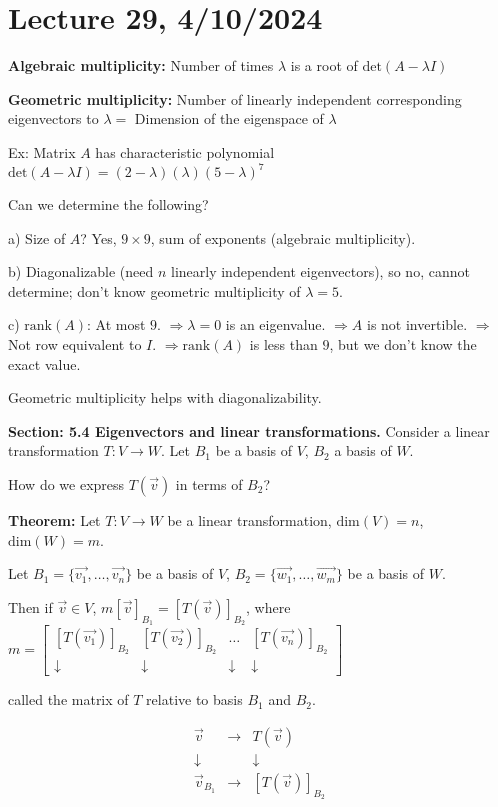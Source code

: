 \documentclass{article}
\begin{document}
\section{Lecture 29, 4/10/2024}

\textbf{Algebraic multiplicity:} Number of times $\lambda$ is a root of $\text{det}(A-\lambda I)$

\textbf{Geometric multiplicity:} Number of linearly independent corresponding eigenvectors to $\lambda =$ Dimension of the eigenspace of $\lambda$

Ex: Matrix $A$ has characteristic polynomial $\text{det}(A-\lambda I) = (2-\lambda)(\lambda)(5-\lambda)^7$

Can we determine the following?

a) Size of $A$? Yes, $9 \times 9$, sum of exponents (algebraic multiplicity).

b) Diagonalizable (need $n$ linearly independent eigenvectors), so no, cannot determine; don't know geometric multiplicity of $\lambda = 5$.

c) $\text{rank}(A)$: At most $9$. $\Rightarrow \lambda = 0$ is an eigenvalue. $\Rightarrow A$ is not invertible. $\Rightarrow$ Not row equivalent to $I$. $\Rightarrow \text{rank}(A)$ is less than $9$, but we don't know the exact value.

Geometric multiplicity helps with diagonalizability.

\textbf{Section: 5.4 Eigenvectors and linear transformations.} Consider a linear transformation $T : V \rightarrow W$. Let $B_1$ be a basis of $V$, $B_2$ a basis of $W$.

How do we express $T(\vec{v})$ in terms of $B_2$?

\textbf{Theorem:} Let $T : V \rightarrow W$ be a linear transformation, $\text{dim}(V) = n$, $\text{dim}(W) = m$. 

Let $B_1 = \{\vec{v_1}, \ldots, \vec{v_n}\}$ be a basis of $V$, $B_2 = \{\vec{w_1}, \ldots, \vec{w_m}\}$ be a basis of $W$.

Then if $\vec{v} \in V$, $m[\vec{v}]_{B_1} = [T(\vec{v})]_{B_2}$, where $m = \begin{bmatrix} [T(\vec{v_1})]_{B_2} & [T(\vec{v_2})]_{B_2} & \ldots & [T(\vec{v_n})]_{B_2} \\ \downarrow & \downarrow & \downarrow & \downarrow \end{bmatrix}$

called the matrix of $T$ relative to basis $B_1$ and $B_2$.

\[
\begin{array}{ccc}
\vec{v} & \rightarrow & T(\vec{v}) \\
\downarrow & & \downarrow \\
\vec{v}_{B_1} & \rightarrow & [T(\vec{v})]_{B_2}
\end{array}
\]
\end{document}
